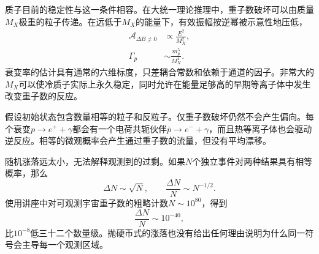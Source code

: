 质子目前的稳定性与这一条件相容。在大统一理论推理中，重子数破坏可以由质量\(M_X\)极重的粒子传递。在远低于\(M_X\)的能量下，有效振幅按逆幂被示意性地压低，
\begin{equation}
\begin{aligned}
\mathcal A_{\Delta B\ne0}&\propto \frac{E^2}{M_X^2},\\
\Gamma_p&\sim \frac{m_p^5}{M_X^4}.
\end{aligned}
\label{eq:c08-heavy-suppression}
\end{equation}
衰变率的估计具有通常的六维标度，只差耦合常数和依赖于通道的因子。非常大的\(M_X\)可以使冷质子实际上永久稳定，同时允许在能量足够高的早期等离子体中发生改变重子数的反应。

\begin{classroomqa}
\end{classroomqa}

假设初始状态包含数量相等的粒子和反粒子。仅重子数破坏仍然不会产生偏向。每个衰变\(p\to e^++\gamma\)都会有一个电荷共轭伙伴\(\bar p\to e^-+\gamma\)，而且热等离子体也会驱动逆反应。相等的微观概率会产生通过重子数的流量，但没有平均漂移。

\begin{classroomqa}
\end{classroomqa}

随机涨落远太小，无法解释观测到的过剩。如果\(N\)个独立事件对两种结果具有相等概率，那么
\begin{equation}
\Delta N\sim\sqrt N,
\qquad
\frac{\Delta N}{N}\sim N^{-1/2}.
\end{equation}
使用讲座中对可观测宇宙重子数的粗略计数\(N\sim10^{80}\)，得到
\begin{equation}
\frac{\Delta N}{N}\sim10^{-40},
\end{equation}
比\(10^{-8}\)低三十二个数量级。抛硬币式的涨落也没有给出任何理由说明为什么同一符号会主导每一个观测区域。

\begin{classroomqa}
\end{classroomqa}

